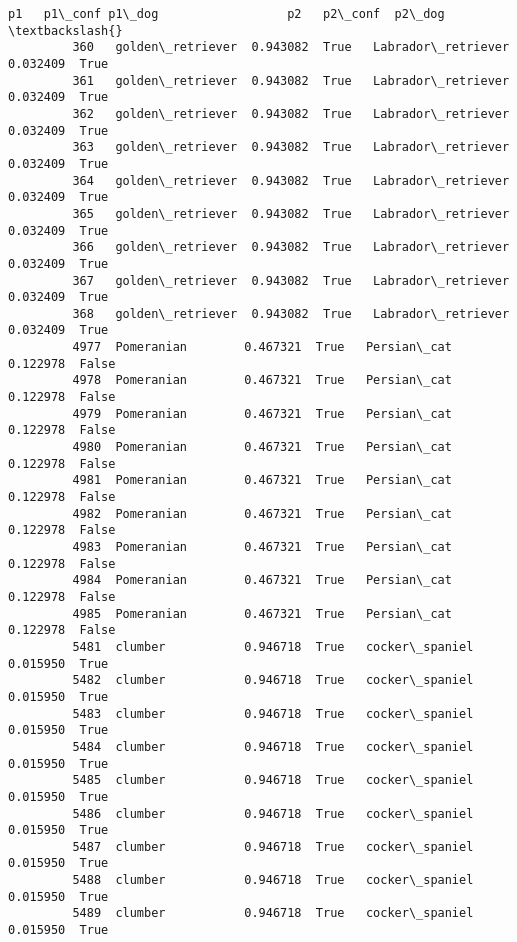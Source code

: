 \documentclass[11pt]{article}
\begin{document}
\begin{Verbatim}[commandchars=\\\{\}]
                             p1   p1\_conf p1\_dog                  p2   p2\_conf  p2\_dog  \textbackslash{}
         360   golden\_retriever  0.943082  True   Labrador\_retriever  0.032409  True     
         361   golden\_retriever  0.943082  True   Labrador\_retriever  0.032409  True     
         362   golden\_retriever  0.943082  True   Labrador\_retriever  0.032409  True     
         363   golden\_retriever  0.943082  True   Labrador\_retriever  0.032409  True     
         364   golden\_retriever  0.943082  True   Labrador\_retriever  0.032409  True     
         365   golden\_retriever  0.943082  True   Labrador\_retriever  0.032409  True     
         366   golden\_retriever  0.943082  True   Labrador\_retriever  0.032409  True     
         367   golden\_retriever  0.943082  True   Labrador\_retriever  0.032409  True     
         368   golden\_retriever  0.943082  True   Labrador\_retriever  0.032409  True     
         4977  Pomeranian        0.467321  True   Persian\_cat         0.122978  False    
         4978  Pomeranian        0.467321  True   Persian\_cat         0.122978  False    
         4979  Pomeranian        0.467321  True   Persian\_cat         0.122978  False    
         4980  Pomeranian        0.467321  True   Persian\_cat         0.122978  False    
         4981  Pomeranian        0.467321  True   Persian\_cat         0.122978  False    
         4982  Pomeranian        0.467321  True   Persian\_cat         0.122978  False    
         4983  Pomeranian        0.467321  True   Persian\_cat         0.122978  False    
         4984  Pomeranian        0.467321  True   Persian\_cat         0.122978  False    
         4985  Pomeranian        0.467321  True   Persian\_cat         0.122978  False    
         5481  clumber           0.946718  True   cocker\_spaniel      0.015950  True     
         5482  clumber           0.946718  True   cocker\_spaniel      0.015950  True     
         5483  clumber           0.946718  True   cocker\_spaniel      0.015950  True     
         5484  clumber           0.946718  True   cocker\_spaniel      0.015950  True     
         5485  clumber           0.946718  True   cocker\_spaniel      0.015950  True     
         5486  clumber           0.946718  True   cocker\_spaniel      0.015950  True     
         5487  clumber           0.946718  True   cocker\_spaniel      0.015950  True     
         5488  clumber           0.946718  True   cocker\_spaniel      0.015950  True     
         5489  clumber           0.946718  True   cocker\_spaniel      0.015950  True     
         

\end{Verbatim}
\end{document}
